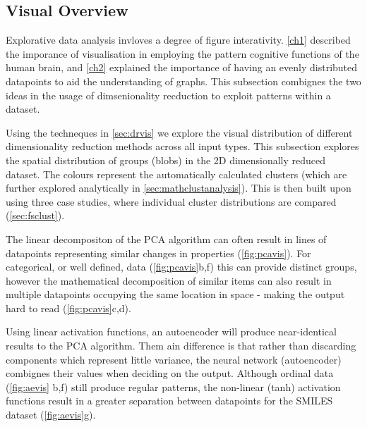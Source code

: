 % 

\subsection{Visual Overview}\label{sec:cldist}
Explorative data analysis invloves a degree of figure interativity. \autoref{ch1} described the imporance of visualisation in employing the pattern cognitive functions of the human brain, and \autoref{ch2} explained the importance of having an evenly distributed datapoints to aid the understanding of graphs. This subsection combignes the two ideas in the usage of dimsenionality recduction to exploit patterns within a dataset. 

Using the techneques in \autoref{sec:drvis} we explore the visual distribution of different dimensionality reduction methods across all input types. This subsection explores the spatial distribution of groups (blobs) in the 2D dimensionally reduced dataset. The colours represent the automatically calculated clusters (which are further explored analytically in \autoref{sec:mathclustanalysis}).
This is then built upon using three case studies, where individual cluster distributions are compared (\autoref{sec:fsclust}).

The linear decompositon of the PCA algorithm can often result in lines of datapoints representing similar changes in properties (\autoref{fig:pcavis}). For categorical, or well defined, data (\autoref{fig:pcavis}b,f) this can provide distinct groups, however the mathematical decomposition of similar items can also result in multiple datapoints occupying the same location in space - making the output hard to read (\autoref{fig:pcavis}c,d).

Using linear activation functions, an autoencoder will produce near-identical results to the PCA algorithm. Them ain difference is that rather than discarding components which represent little variance, the neural network (autoencoder) combignes their values when deciding on the output. Although ordinal data (\autoref{fig:aevis} b,f) still produce regular patterns, the non-linear (tanh) activation functions result in a greater separation between datapoints for the SMILES dataset (\autoref{fig:aevis}g).

